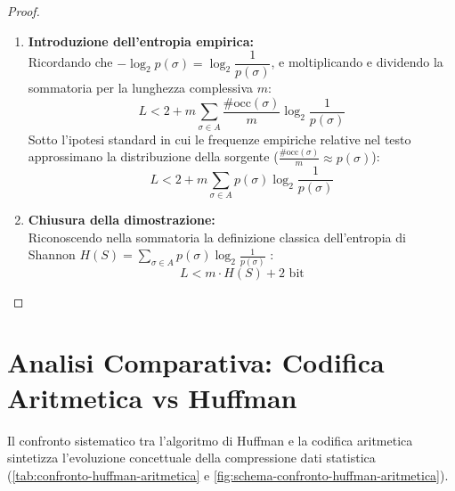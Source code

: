 \begin{proof}
\begin{enumerate}
  \item \textbf{Introduzione dell'entropia empirica:}\\
  Ricordando che $-\log_2 p(\sigma) = \log_2 \dfrac{1}{p(\sigma)}$, e moltiplicando e dividendo la sommatoria per la lunghezza complessiva $m$:
  \begin{equation}
    L < 2 + m \sum_{\sigma \in A} \frac{\#\text{occ}(\sigma)}{m} \log_2 \frac{1}{p(\sigma)}
  \end{equation}
  Sotto l'ipotesi standard in cui le frequenze empiriche relative nel testo approssimano la distribuzione della sorgente ($\frac{\#\text{occ}(\sigma)}{m} \approx p(\sigma)$):
  \begin{equation}
    L < 2 + m \sum_{\sigma \in A} p(\sigma) \log_2 \frac{1}{p(\sigma)}
  \end{equation}

  \item \textbf{Chiusura della dimostrazione:}\\
  Riconoscendo nella sommatoria la definizione classica dell'entropia di Shannon $H(S) = \sum_{\sigma \in A} p(\sigma) \log_2 \frac{1}{p(\sigma)}$ \cite{shannon1948}:
  \begin{equation}
    L < m \cdot H(S) + 2\text{ bit}
  \end{equation}
\end{enumerate}
\end{proof}

\FloatBarrier
\section{Analisi Comparativa: Codifica Aritmetica vs Huffman}
\label{sec:confronto-aritmetica-huffman}

Il confronto sistematico tra l'algoritmo di Huffman e la codifica aritmetica sintetizza l'evoluzione concettuale della compressione dati statistica (\autoref{tab:confronto-huffman-aritmetica} e \autoref{fig:schema-confronto-huffman-aritmetica}).

